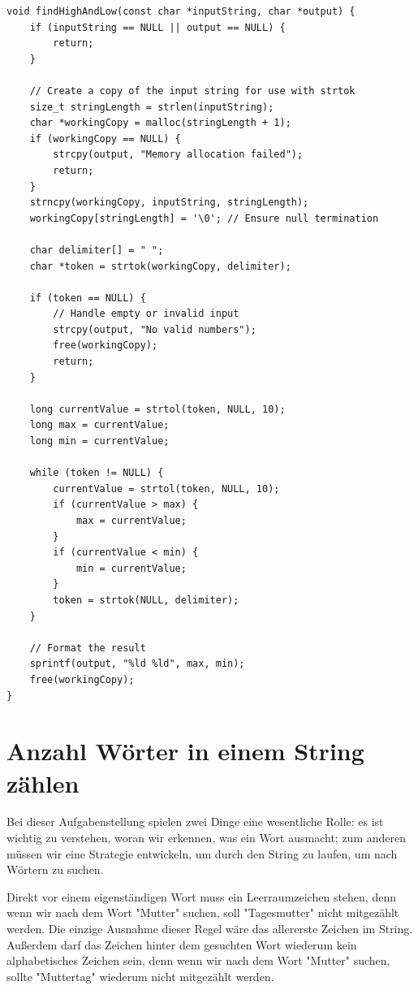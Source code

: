 \begin{verbatim}
void findHighAndLow(const char *inputString, char *output) {
    if (inputString == NULL || output == NULL) {
        return;
    }

    // Create a copy of the input string for use with strtok
    size_t stringLength = strlen(inputString);
    char *workingCopy = malloc(stringLength + 1);
    if (workingCopy == NULL) {
        strcpy(output, "Memory allocation failed");
        return;
    }
    strncpy(workingCopy, inputString, stringLength);
    workingCopy[stringLength] = '\0'; // Ensure null termination

    char delimiter[] = " ";
    char *token = strtok(workingCopy, delimiter);

    if (token == NULL) {
        // Handle empty or invalid input
        strcpy(output, "No valid numbers");
        free(workingCopy);
        return;
    }

    long currentValue = strtol(token, NULL, 10);
    long max = currentValue;
    long min = currentValue;

    while (token != NULL) {
        currentValue = strtol(token, NULL, 10);
        if (currentValue > max) {
            max = currentValue;
        }
        if (currentValue < min) {
            min = currentValue;
        }
        token = strtok(NULL, delimiter);
    }

    // Format the result
    sprintf(output, "%ld %ld", max, min);
    free(workingCopy);
}
\end{verbatim}






\chapter{Anzahl Wörter in einem String zählen}

Bei dieser Aufgabenstellung spielen zwei Dinge eine wesentliche Rolle: es ist
wichtig zu verstehen, woran wir erkennen, was ein Wort ausmacht; zum anderen
müssen wir eine Strategie entwickeln, um durch den String zu laufen, um nach
Wörtern zu suchen.

Direkt vor einem eigenständigen Wort muss ein Leerraumzeichen stehen, denn wenn
wir nach dem Wort "Mutter" suchen, soll "Tagesmutter" nicht mitgezählt werden.
Die einzige Ausnahme dieser Regel wäre das allererste Zeichen im String.
Außerdem darf das Zeichen hinter dem gesuchten Wort wiederum kein alphabetisches
Zeichen sein, denn wenn wir nach dem Wort "Mutter" suchen, sollte "Muttertag"
wiederum nicht mitgezählt werden.

